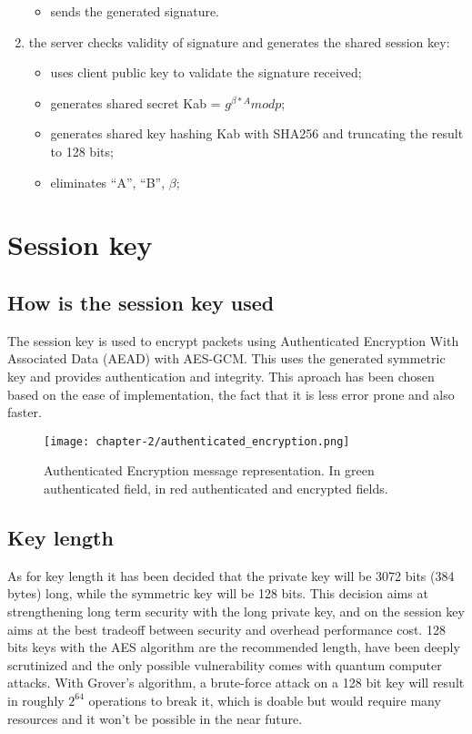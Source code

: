 \begin{enumerate}
\begin{itemize}
		\item sends the generated signature. 
	\end{itemize}
	\item the server checks validity of signature and generates the shared session key:
	\begin{itemize}
		\item uses client public key to validate the signature received;
		\item generates shared secret Kab = \(g^{\beta*A} mod p\);
		\item generates shared key hashing Kab with SHA256 and truncating the result to 128 bits;
		\item eliminates ``A'', ``B'', \(\beta\);
	\end{itemize}	 
\end{enumerate}

\newpage{}
\section{Session key}

\subsection{How is the session key used}

The session key is used to encrypt packets using Authenticated Encryption With Associated Data (AEAD) with AES-GCM. This uses the generated symmetric key and provides authentication and integrity. This aproach has been chosen based on the ease of implementation, the fact that it is less error prone and also faster. 

\begin{figure}[!h] 
    \centering 
    \texttt{[image: chapter-2/authenticated\_encryption.png]} 
    \caption{Authenticated Encryption message representation. In green authenticated field, in red authenticated and encrypted fields.}
    \label{fig:authenticated_encryption}
\end{figure}

\subsection{Key length}

As for key length it has been decided that the private key will be 3072 bits (384 bytes) long, while the symmetric key will be 128 bits. This decision aims at strengthening long term security with the long private key, and on the session key aims at the best tradeoff between security and overhead performance cost. 128 bits keys with the AES algorithm are the recommended length, have been deeply scrutinized and the only possible vulnerability comes with quantum computer attacks. With Grover's algorithm, a brute-force attack on a 128 bit key will result in roughly \(2^64\) operations to break it, which is doable but would require many resources and it won’t be possible in the near future.

